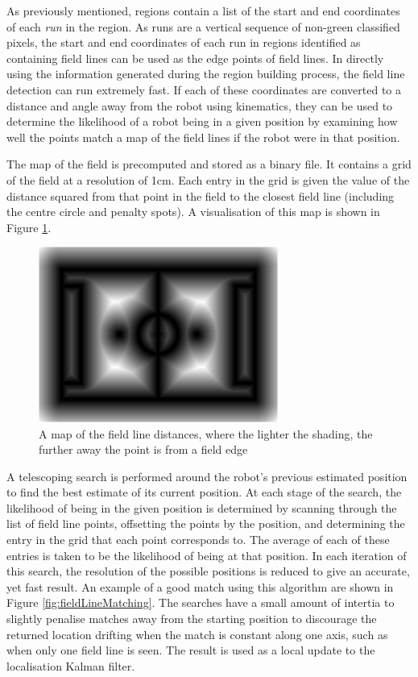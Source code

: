 \documentclass[runningheads,a4paper]{llncs}
\begin{document}
As previously mentioned, regions contain a list of the start and end coordinates of each \emph{run} in the region. As runs are a vertical sequence of non-green classified pixels, the start and end coordinates of each run in regions identified as containing field lines can be used as the edge points of field lines. In directly using the information generated during the region building process, the field line detection can run extremely fast. If each of these coordinates are converted to a distance and angle away from the robot using kinematics, they can be used to determine the likelihood of a robot being in a given position by examining how well the points match a map of the field lines if the robot were in that position.

The map of the field is precomputed and stored as a binary file. It contains a grid of the field at a resolution of 1cm. Each entry in the grid is given the value of the distance squared from that point in the field to the closest field line (including the centre circle and penalty spots). A visualisation of this map is shown in Figure \ref{fig:fieldDistancesMap}. 

\begin{figure} [t]
\centering
\includegraphics[width=0.7\textwidth]{figures/fieldDistancesMap.png}
\caption{A map of the field line distances, where the lighter the shading, the further away the point is from a field edge} \label{fig:fieldDistancesMap}
\end{figure}

A telescoping search is performed around the robot's previous estimated position to find the best estimate of its current position. At each stage of the search, the likelihood of being in the given position is determined by scanning through the list of field line points, offsetting the points by the position, and determining the entry in the grid that each point corresponds to. The average of each of these entries is taken to be the likelihood of being at that position. In each iteration of this search, the resolution of the possible positions is reduced to give an accurate, yet fast result. An example of a good match using this algorithm are shown in Figure \ref{fig:fieldLineMatching}. The searches have a small amount of intertia to slightly penalise matches away from the starting position to discourage the returned location drifting when the match is constant along one axis, such as when only one field line is seen. The result is used as a local update to the localisation Kalman filter.
\end{document}
